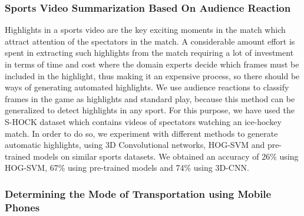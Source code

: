 \documentclass{article}
\begin{document}
\subsubsection{Sports Video Summarization Based On Audience Reaction}

Highlights in a sports video are the key exciting moments in the match which attract attention of the spectators in the match. A considerable amount effort is spent in extracting such highlights from the match requiring a lot of investment in terms of time and cost where the domain experts decide which frames must be included in the highlight, thus making it an expensive process, so there should be ways of generating automated highlights. We use audience reactions to classify frames in the game as highlights and standard play, because this method can be generalized to detect highlights in any sport. For this purpose, we have used the S-HOCK dataset which contains videos of spectators watching an ice-hockey match. In order to do so, we experiment with different methods to generate automatic highlights, using 3D Convolutional networks, HOG-SVM and pre-trained models on similar sports datasets. We obtained an accuracy of 26\% using HOG-SVM, 67\% using pre-trained models and 74\% using 3D-CNN.

\subsubsection{Determining the Mode of Transportation using Mobile Phones}
\end{document}
